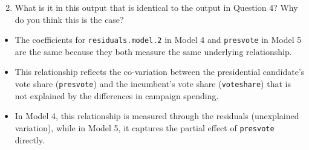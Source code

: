 \documentclass[12pt,letterpaper]{article}
\begin{document}
\noindent\begin{enumerate}[left=0pt]
\setcounter{enumi}{1}	
\item What is it in this output that is identical to the output in Question 4? Why do you think this is the case?
\end{enumerate}
\begin{itemize}
	\item The coefficients for \texttt{residuals.model.2} in Model 4 and \texttt{presvote} in Model 5 are the same because they both measure the same underlying relationship.
	\item This relationship reflects the co-variation between the presidential candidate’s vote share (\texttt{presvote}) and the incumbent’s vote share (\texttt{voteshare}) that is not explained by the differences in campaign spending.
	\item In Model 4, this relationship is measured through the residuals (unexplained variation), while in Model 5, it captures the partial effect of \texttt{presvote} directly.
\end{itemize}
\end{document}
